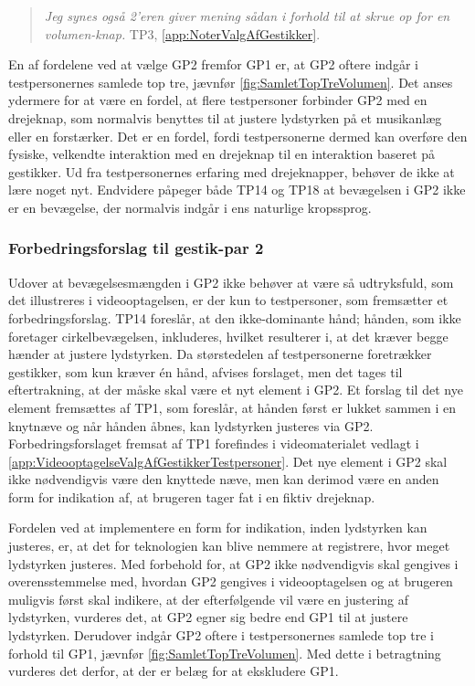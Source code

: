 % 
%
\begin{quotation}
	\noindent
	\textit{Jeg synes også 2'eren giver mening sådan i forhold til at skrue op for en volumen-knap.} TP3, \autoref{app:NoterValgAfGestikker}.
\noindent
\end{quotation}
%
En af fordelene ved at vælge GP2 fremfor GP1 er, at GP2 oftere indgår i testpersonernes samlede top tre, jævnfør \autoref{fig:SamletTopTreVolumen}. Det anses ydermere for at være en fordel, at flere testpersoner forbinder GP2 med en drejeknap, som normalvis benyttes til at justere lydstyrken på et musikanlæg eller en forstærker. Det er en fordel, fordi testpersonerne dermed kan overføre den fysiske, velkendte interaktion med en drejeknap til en interaktion baseret på gestikker. Ud fra testpersonernes erfaring med drejeknapper, behøver de ikke at lære noget nyt. Endvidere påpeger både TP14 og TP18 at bevægelsen i GP2 ikke er en bevægelse, der normalvis indgår i ens naturlige kropssprog. 
%
\subsubsection{Forbedringsforslag til gestik-par 2}
\label{TestresultaterValgAfGestikkerForbedringGP2Volumen}
%
Udover at bevægelsesmængden i GP2 ikke behøver at være så udtryksfuld, som det illustreres i videooptagelsen, er der kun to testpersoner, som fremsætter et forbedringsforslag. TP14 foreslår, at den ikke-dominante hånd; hånden, som ikke foretager cirkelbevægelsen, inkluderes, hvilket resulterer i, at det kræver begge hænder at justere lydstyrken. Da størstedelen af testpersonerne foretrækker gestikker, som kun kræver én hånd, afvises forslaget, men det tages til eftertrakning, at der måske skal være et nyt element i GP2. Et forslag til det nye element fremsættes af TP1, som foreslår, at hånden først er lukket sammen i en knytnæve og når hånden åbnes, kan lydstyrken justeres via GP2. Forbedringsforslaget fremsat af TP1 forefindes i videomaterialet vedlagt i \autoref{app:VideooptagelseValgAfGestikkerTestpersoner}. Det nye element i GP2 skal ikke nødvendigvis være den knyttede næve, men kan derimod være en anden form for indikation af, at brugeren tager fat i en fiktiv drejeknap. 

Fordelen ved at implementere en form for indikation, inden lydstyrken kan justeres, er, at det for teknologien kan blive nemmere at registrere, hvor meget lydstyrken justeres.\blankline
%    
Med forbehold for, at GP2 ikke nødvendigvis skal gengives i overensstemmelse med, hvordan GP2 gengives i videooptagelsen og at brugeren muligvis først skal indikere, at der efterfølgende vil være en justering af lydstyrken, vurderes det, at GP2 egner sig bedre end GP1 til at justere lydstyrken. Derudover indgår GP2 oftere i testpersonernes samlede top tre i forhold til GP1, jævnfør \autoref{fig:SamletTopTreVolumen}. Med dette i betragtning vurderes det derfor, at der er belæg for at ekskludere GP1. 
%

